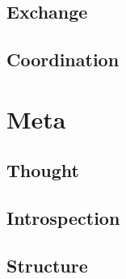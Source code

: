 \documentclass[oneside,hidelinks]{book}
\begin{document}
\chapter{Exchange}

\chapter{Coordination}

\part{Meta}

\chapter{Thought}

\chapter{Introspection}

\chapter{Structure}
\end{document}
